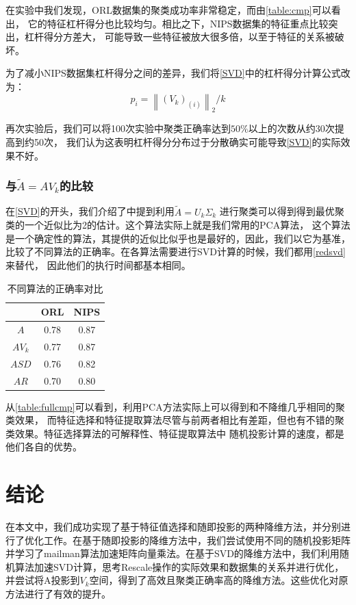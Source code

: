 \documentclass{ctexart}
\begin{document}
    在实验中我们发现，ORL数据集的聚类成功率非常稳定，而由\autoref{table:cmp}可以看出，
    它的特征杠杆得分也比较均匀。相比之下，NIPS数据集的特征重点比较突出，杠杆得分方差大，
    可能导致一些特征被放大很多倍，以至于特征的关系被破坏。

    为了减小NIPS数据集杠杆得分之间的差异，我们将\autoref{SVD}中的杠杆得分计算公式改为：
    $$
    p_{i}=\left\|\left(V_{k}\right)_{(i)}\right\|_{2} / k
    $$

    再次实验后，我们可以将100次实验中聚类正确率达到$50\%$以上的次数从约30次提高到约50次，
    我们认为这表明杠杆得分分布过于分散确实可能导致\autoref{SVD}的实际效果不好。

    \subsubsection{与$\tilde{A}=A V_k$的比较}
    \label{sec:cmppca}
    在\autoref{SVD}的开头，我们介绍了\cite{drineas1999clustering}中提到利用$\tilde{A}=U_k \Sigma_k$
    进行聚类可以得到得到最优聚类的一个近似比为2的估计。这个算法实际上就是我们常用的PCA算法，
    这个算法是一个确定性的算法，其提供的近似比似乎也是最好的，因此，我们以它为基准，
    比较了不同算法的正确率。在各算法需要进行SVD计算的时候，我们都用\autoref{redsvd}来替代，
    因此他们的执行时间都基本相同。

    \begin{table}[h]
        \centering
        \begin{tabular}{|c|c|c|}
            \hline
            & ORL & NIPS \\ \hline
            $A$ & 0.78 & 0.87 \\ \hline
            $AV_k$ & 0.77 & 0.87 \\ \hline
            $ASD$ & 0.76 & 0.82 \\ \hline
            $AR$ & 0.70 & 0.80 \\ \hline
        \end{tabular}
        \caption{不同算法的正确率对比}
        \label{table:fullcmp}
    \end{table}

    从\autoref{table:fullcmp}可以看到，利用PCA方法实际上可以得到和不降维几乎相同的聚类效果，
    而特征选择和特征提取算法尽管与前两者相比有差距，但也有不错的聚类效果。特征选择算法的可解释性、特征提取算法中
    随机投影计算的速度，都是他们各自的优势。

    \section{结论}
    在本文中，我们成功实现了基于特征值选择和随即投影的两种降维方法，并分别进行了优化工作。在基于随即投影的降维方法中，我们尝试使用不同的随机投影矩阵并学习了mailman算法加速矩阵向量乘法。在基于SVD的降维方法中，我们利用随机算法加速SVD计算，思考Rescale操作的实际效果和数据集的关系并进行优化，并尝试将A投影到$V_k$空间，得到了高效且聚类正确率高的降维方法。这些优化对原方法进行了有效的提升。

\nocite{*} %


\end{document}
